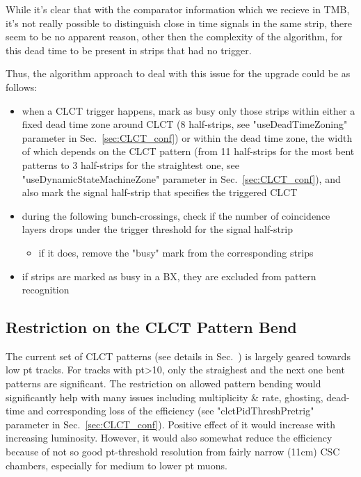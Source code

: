 While it's clear that with the comparator information which we recieve in TMB, it's not really possible to distinguish close in time signals in the same strip, there seem to be no apparent reason, other then the complexity of the algorithm, for this dead time to be present in strips that had no trigger.

Thus, the algorithm approach to deal with this issue for the upgrade could be as follows:
\begin{itemize}
    \item when a CLCT trigger happens, mark as busy only those strips within either a fixed dead time zone around CLCT (8 half-strips, see "useDeadTimeZoning" parameter in Sec.~\ref{sec:CLCT_conf}) or within the dead time zone, the width of which depends on the CLCT pattern (from 11 half-strips for the most bent patterns to 3 half-strips for the straightest one, see "useDynamicStateMachineZone" parameter in Sec.~\ref{sec:CLCT_conf}), and also mark the signal half-strip that specifies the triggered CLCT
    \item during the following bunch-crossings, check if the number of coincidence layers drops under the trigger threshold for the signal half-strip
    \begin{itemize}
	\item if it does, remove the "busy" mark from the corresponding strips 
    \end{itemize}
    \item if strips are marked as busy in a BX, they are excluded from pattern recognition 
\end{itemize}

\subsection{Restriction on the CLCT Pattern Bend}

The current set of CLCT patterns (see details in Sec.~\cite{subsec:clct_algo}) is largely geared towards low pt tracks. For tracks with pt>10, only the straighest and the next one bent patterns are significant. The restriction on allowed pattern bending would significantly help with many issues including multiplicity \& rate, ghosting, dead-time and corresponding loss of the efficiency (see "clctPidThreshPretrig" parameter in Sec.~\ref{sec:CLCT_conf}). Positive effect of it would increase with increasing luminosity. However, it would also somewhat reduce the efficiency because of not so good pt-threshold resolution from fairly narrow (11cm) CSC chambers, especially for medium to lower pt muons.

